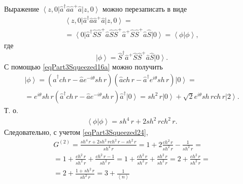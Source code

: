 Выражение
$\left<z,0\right|\hat{a}^{\dag}\hat{a}\hat{a}^{+}\hat{a}\left|z,0\right>$
можно перезаписать в виде
\begin{eqnarray}
  \left<z,0\right|\hat{a}^{\dag}\hat{a}\hat{a}^{+}\hat{a}\left|z,0\right>
  = \nonumber \\
  =
  \left<0\right|\hat{a}^{\dag}\hat{S}\hat{S}^{+}\hat{a}\hat{S}\hat{S}^{+}\hat{a}^{+}\hat{S}\hat{S}^{+}\hat{a}\hat{S}\left|0\right>
  = \left<\phi\right.\left|\phi\right>,
  \nonumber
\end{eqnarray}
где
\[
\left|\phi\right> = \hat{S}^{\dag}\hat{a}^{+}\hat{S}\hat{S}^{+}\hat{a}\hat{S}\left|0\right>.
\]
С помощью \eqref{eqPart3Squeezed16a} можно получить
\begin{eqnarray}
  \left|\phi\right> =  
  \left(\hat{a}^{\dag} ch\,r - \hat{a} e^{-i\theta} sh \, r\right)
  \left(\hat{a} ch\,r - \hat{a}^{\dag} e^{i\theta} sh \, r\right)
  \left|0\right> =
  \nonumber \\
  =
   e^{i\theta} sh \, r \left(\hat{a}^{\dag} ch\,r - \hat{a} e^{-i\theta} sh \, r\right)
   \hat{a}^{\dag}\left|0\right> =
   sh^2 \, r \left|0\right> + \sqrt{2} e^{i\theta}  sh \, r ch \, r\left|2\right>.
  \nonumber
\end{eqnarray}
Т. о.
\begin{eqnarray}
  \left<\phi\right.\left|\phi\right> =
  sh^4 \, r + 2 sh^2 \, r ch^2 \, r.
  \nonumber
\end{eqnarray}
Следовательно, с учетом \eqref{eqPart3Squeezed24},
\begin{eqnarray}
G^{(2)} = \frac{sh^4 \, r + 2 sh^2 \, r ch^2 \, r - sh^2 \, r}{sh^4 \,
  r} = 1 + 2 \frac{ch^2 \, r}{sh^2 \, r} - \frac{1}{sh^2 \, r} =
\nonumber \\
=
1 + \frac{ch^2 \, r}{sh^2 \, r} + \frac{ch^2 \, r - 1}{sh^2 \, r} =
1 + \frac{ch^2 \, r}{sh^2 \, r} + \frac{sh^2 \, r }{sh^2 \, r} =
2 + \frac{ch^2 \, r}{sh^2 \, r} =
\nonumber \\
= 2 + \frac{1 + sh^2 \, r}{sh^2 \, r} = 3 + \frac{1}{\left<n\right>}
\nonumber
\end{eqnarray}

